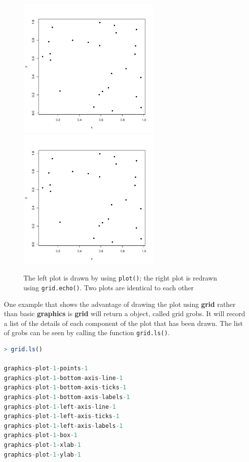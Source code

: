 \documentclass[11pt,twoside]{report}
\begin{document}
\begin{figure}[h]
	\begin{center}
		\includegraphics[height = 7cm, width = 7cm]{figure/report_basic_demo_1.pdf}
		\includegraphics[height = 7cm, width = 7cm]{figure/report_basic_demo_1.pdf}
		\caption{The left plot is drawn by using \texttt{plot()}; the right plot is redrawn using \texttt{grid.echo()}. Two plots are identical to each other}
		\label{figure_1.1}
	\end{center}
\end{figure}
\newpage
One example that shows the advantage of drawing the plot using \textbf{grid} rather than basic \textbf{graphics} is \textbf{grid} will return a object, called grid grobs. It will record a list of the details of each component of the plot that has been drawn. The list of grobs can be seen by calling the function \texttt{grid.ls()}.
\begin{lstlisting}[language = R]
> grid.ls()

graphics-plot-1-points-1
graphics-plot-1-bottom-axis-line-1
graphics-plot-1-bottom-axis-ticks-1
graphics-plot-1-bottom-axis-labels-1
graphics-plot-1-left-axis-line-1
graphics-plot-1-left-axis-ticks-1
graphics-plot-1-left-axis-labels-1
graphics-plot-1-box-1
graphics-plot-1-xlab-1
graphics-plot-1-ylab-1
\end{lstlisting}
\end{document}
